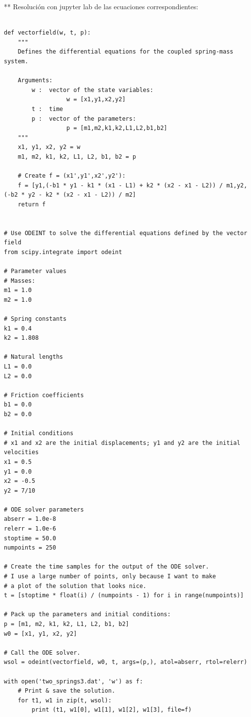 \documentclass{article} %
\begin{document}
\vspace{0.5 cm}

** Resolución con jupyter lab de las ecuaciones correspondientes:

\begin{verbatim} 

def vectorfield(w, t, p):
    """
    Defines the differential equations for the coupled spring-mass system.

    Arguments:
        w :  vector of the state variables:
                  w = [x1,y1,x2,y2]
        t :  time
        p :  vector of the parameters:
                  p = [m1,m2,k1,k2,L1,L2,b1,b2]
    """
    x1, y1, x2, y2 = w
    m1, m2, k1, k2, L1, L2, b1, b2 = p

    # Create f = (x1',y1',x2',y2'):
    f = [y1,(-b1 * y1 - k1 * (x1 - L1) + k2 * (x2 - x1 - L2)) / m1,y2,(-b2 * y2 - k2 * (x2 - x1 - L2)) / m2]
    return f


# Use ODEINT to solve the differential equations defined by the vector field
from scipy.integrate import odeint

# Parameter values
# Masses:
m1 = 1.0
m2 = 1.0

# Spring constants
k1 = 0.4
k2 = 1.808

# Natural lengths
L1 = 0.0
L2 = 0.0

# Friction coefficients
b1 = 0.0
b2 = 0.0

# Initial conditions
# x1 and x2 are the initial displacements; y1 and y2 are the initial velocities
x1 = 0.5
y1 = 0.0
x2 = -0.5
y2 = 7/10

# ODE solver parameters
abserr = 1.0e-8
relerr = 1.0e-6
stoptime = 50.0
numpoints = 250

# Create the time samples for the output of the ODE solver.
# I use a large number of points, only because I want to make
# a plot of the solution that looks nice.
t = [stoptime * float(i) / (numpoints - 1) for i in range(numpoints)]

# Pack up the parameters and initial conditions:
p = [m1, m2, k1, k2, L1, L2, b1, b2]
w0 = [x1, y1, x2, y2]

# Call the ODE solver.
wsol = odeint(vectorfield, w0, t, args=(p,), atol=abserr, rtol=relerr)

with open('two_springs3.dat', 'w') as f:
    # Print & save the solution.
    for t1, w1 in zip(t, wsol):
        print (t1, w1[0], w1[1], w1[2], w1[3], file=f)

\end{verbatim}
\end{document}
